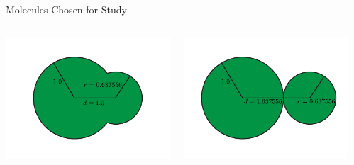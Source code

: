 \documentclass[16pt, aspectratio=43,compress]{beamer}
\begin{document}
\begin{frame}{Molecules Chosen for Study}
    \begin{columns}
        \begin{column}{0.3\linewidth}
            \centering
            \includegraphics[width=\textwidth]{sone}\\
            \done
        \end{column}
        \begin{column}{0.3\linewidth}
            \centering
            \includegraphics[width=\textwidth]{scon}\\
            \dcon
        \end{column}
        \begin{column}{0.3\linewidth}

\end{column}
\end{columns}
\end{frame}
\end{document}
